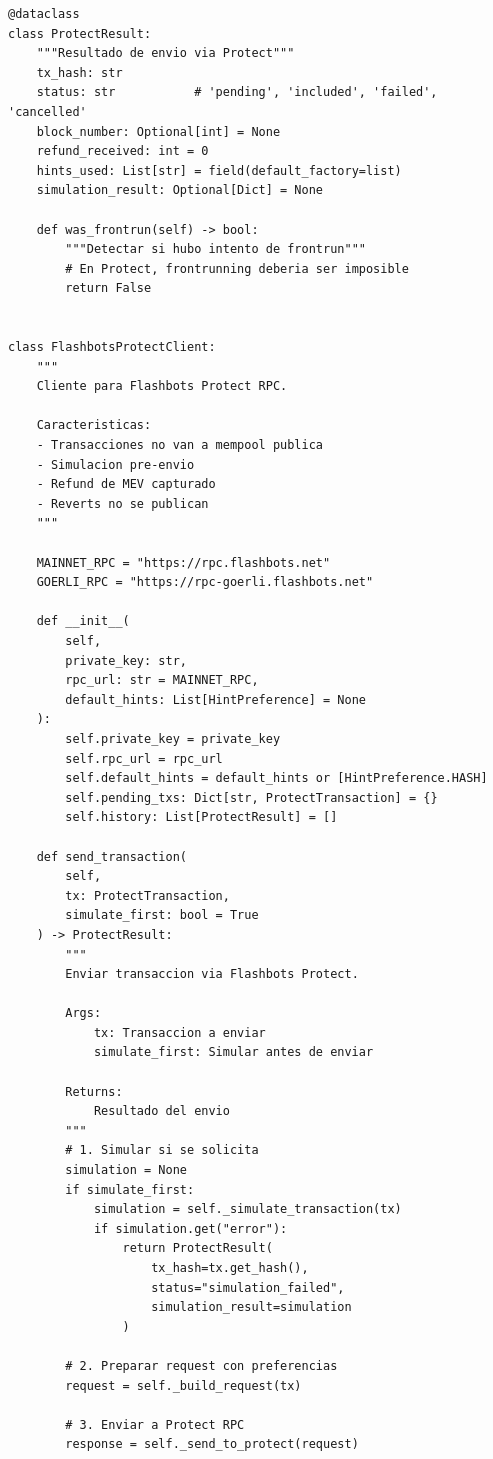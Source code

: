 \documentclass[11pt,a4paper,twoside]{book}
\theoremstyle{definition}
\theoremstyle{remark}
\begin{document}
\begin{lstlisting}[style=python, caption={Cliente para Flashbots Protect RPC}]
@dataclass
class ProtectResult:
    """Resultado de envio via Protect"""
    tx_hash: str
    status: str           # 'pending', 'included', 'failed', 'cancelled'
    block_number: Optional[int] = None
    refund_received: int = 0
    hints_used: List[str] = field(default_factory=list)
    simulation_result: Optional[Dict] = None
    
    def was_frontrun(self) -> bool:
        """Detectar si hubo intento de frontrun"""
        # En Protect, frontrunning deberia ser imposible
        return False


class FlashbotsProtectClient:
    """
    Cliente para Flashbots Protect RPC.
    
    Caracteristicas:
    - Transacciones no van a mempool publica
    - Simulacion pre-envio
    - Refund de MEV capturado
    - Reverts no se publican
    """
    
    MAINNET_RPC = "https://rpc.flashbots.net"
    GOERLI_RPC = "https://rpc-goerli.flashbots.net"
    
    def __init__(
        self,
        private_key: str,
        rpc_url: str = MAINNET_RPC,
        default_hints: List[HintPreference] = None
    ):
        self.private_key = private_key
        self.rpc_url = rpc_url
        self.default_hints = default_hints or [HintPreference.HASH]
        self.pending_txs: Dict[str, ProtectTransaction] = {}
        self.history: List[ProtectResult] = []
        
    def send_transaction(
        self,
        tx: ProtectTransaction,
        simulate_first: bool = True
    ) -> ProtectResult:
        """
        Enviar transaccion via Flashbots Protect.
        
        Args:
            tx: Transaccion a enviar
            simulate_first: Simular antes de enviar
            
        Returns:
            Resultado del envio
        """
        # 1. Simular si se solicita
        simulation = None
        if simulate_first:
            simulation = self._simulate_transaction(tx)
            if simulation.get("error"):
                return ProtectResult(
                    tx_hash=tx.get_hash(),
                    status="simulation_failed",
                    simulation_result=simulation
                )
        
        # 2. Preparar request con preferencias
        request = self._build_request(tx)
        
        # 3. Enviar a Protect RPC
        response = self._send_to_protect(request)
        

\end{lstlisting}
\end{document}
